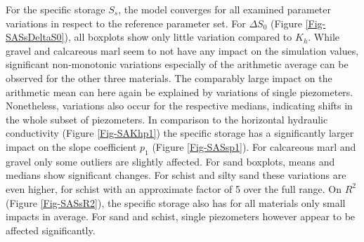 For the specific storage $S_s$, the model converges for all examined parameter variations in respect to the reference parameter set. 
For $\Delta S_0$ (Figure \ref{Fig-SASsDeltaS0}), all boxplots show only little variation compared to $K_h$. 
While gravel and calcareous marl seem to not have any impact on the simulation values, significant non-monotonic variations especially of the arithmetic average can be observed for the other three materials. 
The comparably large impact on the arithmetic mean can here again be explained by variations of single piezometers. 
Nonetheless, variations also occur for the respective medians, indicating shifts in the whole subset of piezometers. 
In comparison to the horizontal hydraulic conductivity (Figure \ref{Fig-SAKhp1}) the specific storage has a significantly larger impact on the slope coefficient $p_1$ (Figure \ref{Fig-SASsp1}). 
For calcareous marl and gravel only some outliers are slightly affected. For sand boxplots, means and medians show significant changes. 
For schist and silty sand these variations are even higher, for schist with an approximate factor of 5 over the full range. 
On $R^2$ (Figure \ref{Fig-SASsR2}), the specific storage also has for all materials only small impacts in average. 
For sand and schist, single piezometers however appear to be affected significantly.

